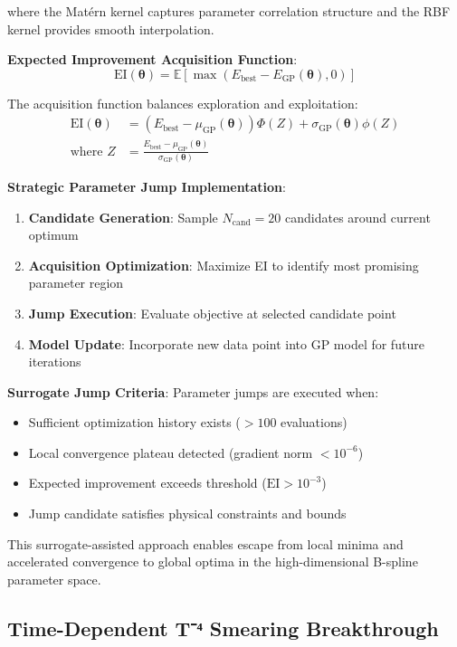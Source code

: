 \documentclass[12pt,a4paper]{article}
\begin{document}
where the Matérn kernel captures parameter correlation structure and the RBF kernel provides smooth interpolation.

\textbf{Expected Improvement Acquisition Function}:
\begin{equation}
\text{EI}(\boldsymbol{\theta}) = \mathbb{E}[\max(E_{\text{best}} - E_{\text{GP}}(\boldsymbol{\theta}), 0)]
\end{equation}

The acquisition function balances exploration and exploitation:
\begin{align}
\text{EI}(\boldsymbol{\theta}) &= (E_{\text{best}} - \mu_{\text{GP}}(\boldsymbol{\theta})) \Phi(Z) + \sigma_{\text{GP}}(\boldsymbol{\theta}) \phi(Z) \\
\text{where } Z &= \frac{E_{\text{best}} - \mu_{\text{GP}}(\boldsymbol{\theta})}{\sigma_{\text{GP}}(\boldsymbol{\theta})}
\end{align}

\textbf{Strategic Parameter Jump Implementation}:
\begin{enumerate}
\item \textbf{Candidate Generation}: Sample $N_{\text{cand}} = 20$ candidates around current optimum
\item \textbf{Acquisition Optimization}: Maximize EI to identify most promising parameter region
\item \textbf{Jump Execution}: Evaluate objective at selected candidate point
\item \textbf{Model Update}: Incorporate new data point into GP model for future iterations
\end{enumerate}

\textbf{Surrogate Jump Criteria}:
Parameter jumps are executed when:
\begin{itemize}
\item Sufficient optimization history exists ($>100$ evaluations)
\item Local convergence plateau detected (gradient norm $< 10^{-6}$)
\item Expected improvement exceeds threshold ($\text{EI} > 10^{-3}$)
\item Jump candidate satisfies physical constraints and bounds
\end{itemize}

This surrogate-assisted approach enables escape from local minima and accelerated convergence to global optima in the high-dimensional B-spline parameter space.

\subsection{Time-Dependent T⁻⁴ Smearing Breakthrough}
\label{sec:time_dependent_t4_smearing}
\end{document}
